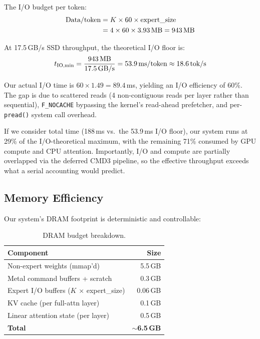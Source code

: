 \documentclass[11pt,twocolumn]{article}
\begin{document}
The I/O budget per token:
\begin{align}
\text{Data/token} &= K \times 60 \times \text{expert\_size} \nonumber \\
                  &= 4 \times 60 \times 3.93\text{\,MB} = 943\text{\,MB} \nonumber
\end{align}

At 17.5\,GB/s SSD throughput, the theoretical I/O floor is:
\begin{equation}
t_\text{IO,min} = \frac{943\text{\,MB}}{17.5\text{\,GB/s}} = 53.9\text{\,ms/token} \approx 18.6\text{\,tok/s}
\end{equation}

Our actual I/O time is $60 \times 1.49 = 89.4$\,ms, yielding an I/O efficiency of 60\%.
The gap is due to scattered reads (4 non-contiguous reads per layer rather than sequential), \texttt{F\_NOCACHE} bypassing the kernel's read-ahead prefetcher, and per-\texttt{pread()} system call overhead.

If we consider total time (188\,ms vs.\ the 53.9\,ms I/O floor), our system runs at 29\% of the I/O-theoretical maximum, with the remaining 71\% consumed by GPU compute and CPU attention.
Importantly, I/O and compute are partially overlapped via the deferred CMD3 pipeline, so the effective throughput exceeds what a serial accounting would predict.

\subsection{Memory Efficiency}

Our system's DRAM footprint is deterministic and controllable:

\begin{table}[t]
\centering
\small
\caption{DRAM budget breakdown.}
\label{tab:memory}
\begin{tabular}{@{}lr@{}}
\toprule
\textbf{Component} & \textbf{Size} \\
\midrule
Non-expert weights (mmap'd) & 5.5\,GB \\
Metal command buffers + scratch & 0.3\,GB \\
Expert I/O buffers ($K$ $\times$ expert\_size) & 0.06\,GB \\
KV cache (per full-attn layer) & 0.1\,GB \\
Linear attention state (per layer) & 0.5\,GB \\
\midrule
\textbf{Total} & \textbf{$\sim$6.5\,GB} \\
\bottomrule
\end{tabular}
\end{table}
\end{document}
